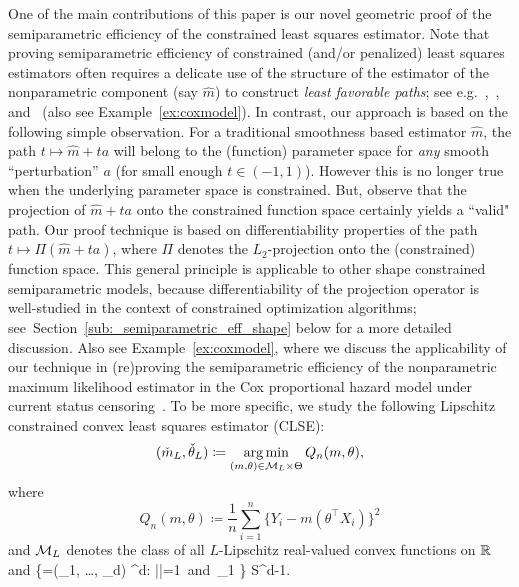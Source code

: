 One of the main contributions of this paper is our novel geometric proof of the semiparametric efficiency of the constrained least squares estimator. Note that proving semiparametric efficiency of constrained (and/or penalized) least squares estimators often requires a delicate use of the structure of the estimator of the nonparametric component (say $\hat m$) to construct {\it least favorable paths}; see e.g.~\cite{VANC},~\cite[Chapter 9.3]{VdV02}, and~\cite{MR1394975} (also see Example~\ref{ex:coxmodel}). In contrast, our approach is based on the following simple observation. For a traditional smoothness based estimator $\hat{m}$, the path $t \mapsto \hat{m} + t a$ will belong to the (function) parameter space for {\it any} smooth ``perturbation'' $a$ (for small enough $t \in (-1,1)$). However this is no longer true when the underlying parameter space is constrained. But,  observe that the projection of $\hat{m} + t a$ onto the constrained function space certainly yields a ``valid" path. Our proof technique is based on differentiability properties of the path $t\mapsto \Pi (\hat{m} + ta)$, where $\Pi$ denotes the $L_2$-projection onto the (constrained) function space. This general  principle is applicable to other shape constrained semiparametric models, because differentiability of the projection operator is well-studied  in the context of constrained optimization algorithms; see~Section~\ref{sub:_semiparametric_eff_shape} below for a more detailed discussion. {Also see Example~\ref{ex:coxmodel}, where we discuss the applicability of our technique in (re)proving the semiparametric efficiency of the nonparametric maximum likelihood estimator in the Cox proportional hazard model under current status censoring~\cite{MR1394975}.}
To be more specific, we study the following Lipschitz constrained convex least squares estimator (CLSE): 
\begin{equation}\label{eq:CLSE}
(\check{m}_{L},\check{\theta}_{L}) \coloneqq \operatorname*{arg\,min}_{(m,\theta) \in \mathcal{M}_{L} \times\Theta} Q_n(m, \theta),
\end{equation}
where
\begin{equation}\label{eq:CLSE-2}
Q_n(m, \theta)\coloneqq \frac{1}{n} \sum_{i=1}^n \{Y_i - m(\theta^\top X_i)\}^2
\end{equation}
and  $\mathcal{M}_L$ denotes the class of all $L$-Lipschitz real-valued convex functions on $\mathbb{R}$ and
\be\label{smooth:eq:theta}
\Theta \coloneqq \{\eta=(\eta_1, \ldots, \eta_d) \in{}^d: |\eta|=1\mbox{ and }\eta_{1} \} \subset S^{d-1}.
